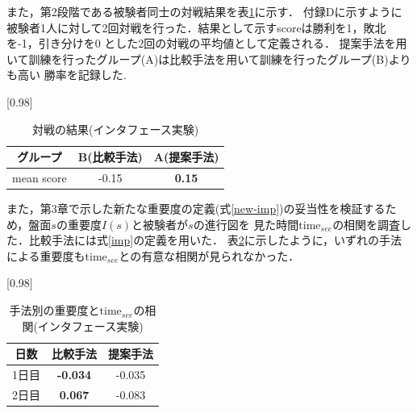 \begin{table}[H]
    \caption{先読み手数制限なしの場合(インタフェース実験)}
    \scriptsize
    \centering
    \label{table:system-100}
\end{table}
また，第2段階である被験者同士の対戦結果を表\ref{table:result-battle}に示す．
付録Dに示すように被験者1人に対して2回対戦を行った．結果として示すscoreは勝利を1，敗北を-1，引き分けを0
とした2回の対戦の平均値として定義される．
提案手法を用いて訓練を行ったグループ(A)は比較手法を用いて訓練を行ったグループ(B)よりも高い
勝率を記録した.
\begin{table}[H]
	\caption{対戦の結果(インタフェース実験)}
    \label{table:result-battle}
	\centering
	\scalebox{0.98}[0.98]{
		\begin{tabular}{c|c|c}
            グループ & B(比較手法)  & A(提案手法) \\ \hline
			mean score &  -0.15   & \bf{0.15}\\ \hline
		\end{tabular}
	}
	
\end{table}
また，第3章で示した新たな重要度の定義(式\ref{new-imp})の妥当性を検証するため，盤面$s$の重要度$I(s)$と被験者が$s$の進行図を
見た時間$\textrm{time}_{see}$の相関を調査した．比較手法には式\ref{imp}の定義を用いた．
表\ref{table:result-imp}に示したように，いずれの手法による重要度も$\textrm{time}_{see}$との有意な相関が見られなかった．
\begin{table}[H]
	\caption{手法別の重要度と$\textrm{time}_{see}$の相関(インタフェース実験)}
    \label{table:result-imp}
	\centering
	\scalebox{0.98}[0.98]{
		\begin{tabular}{c|c|c}
			日数& 比較手法& 提案手法  \\ \hline
			1日目& \bf{-0.034}& {-0.035}\\
            2日目& \bf{0.067}& {-0.083}\\
		\end{tabular}
	}
	
\end{table}


